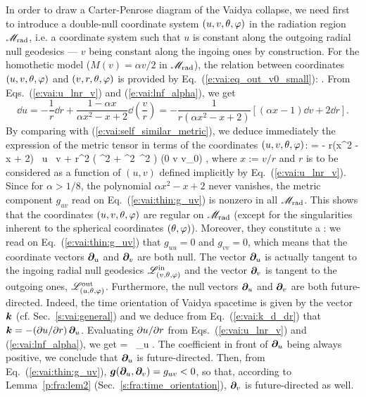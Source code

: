 In order to draw a Carter-Penrose diagram of the Vaidya collapse,
we need first to introduce a double-null coordinate system $(u, v, \theta,\varphi)$
in the radiation region $\mathscr{M}_{\rm rad}$, i.e. a coordinate system such that
$u$ is constant along the outgoing radial null geodesics ---
$v$ being constant along the ingoing ones by construction.
For the homothetic model ($M(v) = \alpha v /2$ in $\mathscr{M}_{\rm rad}$),
the relation between coordinates $(u, v, \theta,\varphi)$ and
$(v, r, \theta, \varphi)$ is provided by Eq.~(\ref{e:vai:eq_out_v0_small}):
\be \label{e:vai:u_lnr_v}
    .
\ee
From Eqs.~(\ref{e:vai:u_lnr_v}) and (\ref{e:vai:lnf_alpha}), we get
\[
   \dd u = - \frac{1}{r} \dd r  +  \frac{1 - \alpha x}{\alpha x^2 - x + 2} \dd\left(\frac{v}{r}\right)
    = - \frac{1}{r(\alpha x^2 - x + 2)} \left[ (\alpha x - 1) \dd v + 2 \dd r \right] .
\]
By comparing with (\ref{e:vai:self_similar_metric}), we deduce immediately
the expression of the metric tensor in terms of the coordinates $(u,v,\theta,\varphi)$:
\be \label{e:vai:thin:g_uv}
     =  - r(\alpha x^2 - x + 2) \, \dd u \, \dd v
    + r^2 \left( \dd\th^2 + \sin^2\th\, \dd\ph^2 \right) \qquad
        (0 \leq v \leq v_0) ,
\ee
where $x := v/r$  and $r$ is to be considered as a function of $(u,v)$ defined implicitly
by Eq.~(\ref{e:vai:u_lnr_v}).
Since for $\alpha > 1/8$, the polynomial $\alpha x^2 - x + 2$ never vanishes,
the metric component $g_{uv}$ read on Eq.~(\ref{e:vai:thin:g_uv}) is
nonzero in all $\mathscr{M}_{\rm rad}$. This shows that
the coordinates $(u,v,\theta,\varphi)$ are regular on $\mathscr{M}_{\rm rad}$
(except for the singularities inherent to the spherical coordinates $(\theta,\varphi)$).
Moreover, they constitute a :
we read on Eq.~(\ref{e:vai:thin:g_uv}) that
$g_{uu} = 0$ and $g_{vv} = 0$, which means that the coordinate vectors $\bm{\partial}_u$
and $\bm{\partial}_v$ are both null. The vector $\bm{\partial}_u$ is actually tangent to the
ingoing radial null geodesics $\mathscr{L}^{\rm in}_{(v,\theta,\varphi)}$
and the vector $\bm{\partial}_v$ is tangent to the outgoing ones, $\mathscr{L}^{\rm out}_{(u,\theta,\varphi)}$.
Furthermore, the null vectors $\bm{\partial}_u$
and $\bm{\partial}_v$ are both future-directed. Indeed,
the time orientation of Vaidya spacetime is given by the vector $\bm{k}$
(cf. Sec.~\ref{s:vai:general}) and we deduce from Eq.~(\ref{e:vai:k_d_dr})
that $\bm{k} = - ({\partial u}/{\partial r}) \, \bm{\partial}_u$. Evaluating ${\partial u}/{\partial r}$
from Eqs.~(\ref{e:vai:u_lnr_v}) and (\ref{e:vai:lnf_alpha}), we get
\be
     = \, \wpar_u .
\ee
The coefficient in front of $\bm{\partial}_u$ being always positive, we conclude that
$\bm{\partial}_u$ is future-directed. Then, from Eq.~(\ref{e:vai:thin:g_uv}),
$\bm{g}(\bm{\partial}_u,\bm{\partial}_v) = g_{uv} < 0$, so that, according to Lemma~\ref{p:fra:lem2}
(Sec.~\ref{s:fra:time_orientation}), $\bm{\partial}_v$ is future-directed as well.

